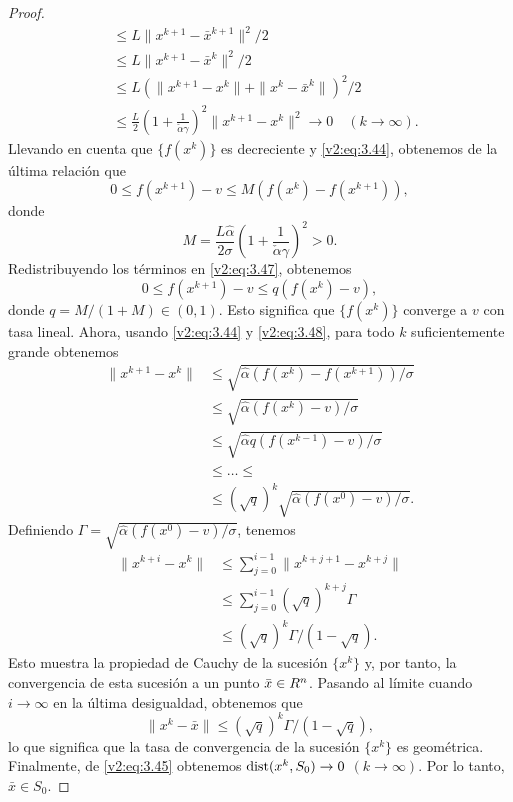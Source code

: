 \begin{proof}
\begin{align*}
        &\le L\|x^{k+1} - \bar{x}^{k+1}\|^2/2 \\
        &\le L\|x^{k+1} - \bar{x}^k\|^2/2 \\
        &\le L(\|x^{k+1} - x^k\| + \|x^k - \bar{x}^k\|)^2/2 \\
        &\le \frac{L}{2} \left(1 + \frac{1}{\check{\alpha}\gamma}\right)^2 \|x^{k+1} - x^k\|^2 \to 0 \quad (k \to \infty).
    \end{align*}
    Llevando en cuenta que $\{f(x^k)\}$ es decreciente y \eqref{v2:eq:3.44}, obtenemos de la última relación que
    \begin{equation}
        0 \le f(x^{k+1}) - v \le M(f(x^k) - f(x^{k+1})),
        \label{v2:eq:3.47}
    \end{equation}
    donde
    \[
        M = \frac{L\hat{\alpha}}{2\sigma} \left(1 + \frac{1}{\check{\alpha}\gamma}\right)^2 > 0.
    \]
    Redistribuyendo los términos en \eqref{v2:eq:3.47}, obtenemos
    \begin{equation}
        0 \le f(x^{k+1}) - v \le q(f(x^k) - v),
        \label{v2:eq:3.48}
    \end{equation}
    donde $q = M/(1+M) \in (0, 1)$. Esto significa que $\{f(x^k)\}$ converge a $v$ con tasa lineal.
    Ahora, usando \eqref{v2:eq:3.44} y \eqref{v2:eq:3.48}, para todo $k$ suficientemente grande obtenemos
    \begin{align*}
        \|x^{k+1} - x^k\| &\le \sqrt{\hat{\alpha}(f(x^k) - f(x^{k+1}))/\sigma} \\
        &\le \sqrt{\hat{\alpha}(f(x^k) - v)/\sigma} \\
        &\le \sqrt{\hat{\alpha} q(f(x^{k-1}) - v)/\sigma} \\
        &\le \dots \le \\
        &\le (\sqrt{q})^k \sqrt{\hat{\alpha}(f(x^0) - v)/\sigma}.
    \end{align*}
    Definiendo $\Gamma = \sqrt{\hat{\alpha}(f(x^0) - v)/\sigma}$, tenemos
    \begin{align*}
        \|x^{k+i} - x^k\| &\le \sum_{j=0}^{i-1} \|x^{k+j+1} - x^{k+j}\| \\
        &\le \sum_{j=0}^{i-1} (\sqrt{q})^{k+j}\Gamma \\
        &\le (\sqrt{q})^k \Gamma / (1 - \sqrt{q}).
    \end{align*}
    Esto muestra la propiedad de Cauchy de la sucesión $\{x^k\}$ y, por tanto, la convergencia de esta sucesión a un punto $\bar{x} \in R^n$. Pasando al límite cuando $i \to \infty$ en la última desigualdad, obtenemos que
    \[
        \|x^k - \bar{x}\| \le (\sqrt{q})^k \Gamma / (1 - \sqrt{q}),
    \]
    lo que significa que la tasa de convergencia de la sucesión $\{x^k\}$ es geométrica. Finalmente, de \eqref{v2:eq:3.45} obtenemos $\operatorname{dist}(x^k, S_0) \to 0$ $(k \to \infty)$. Por lo tanto, $\bar{x} \in S_0$.
\end{proof}

